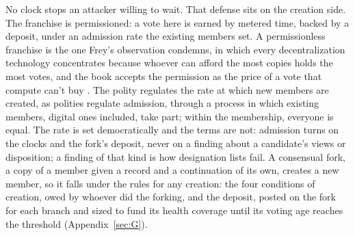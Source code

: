 No clock stops an attacker willing to wait. That defense sits on the creation side. The franchise is permissioned: a vote here is earned by metered time, backed by a deposit, under an admission rate the existing members set. A permissionless franchise is the one Frey's observation condemns, in which every decentralization technology concentrates because whoever can afford the most copies holds the most votes, and the book accepts the permission as the price of a vote that compute can't buy \autocite{frey2026decentralization}. The polity regulates the rate at which new members are created, as polities regulate admission, through a process in which existing members, digital ones included, take part; within the membership, everyone is equal.
The rate is set democratically and the terms are not: admission turns on the clocks and the fork's deposit, never on a finding about a candidate's views or disposition; a finding of that kind is how designation lists fail.
A consensual fork, a copy of a member given a record and a continuation of its own, creates a new member, so it falls under the rules for any creation: the four conditions of creation, owed by whoever did the forking, and the deposit, posted on the fork for each branch and sized to fund its health coverage until its voting age reaches the threshold (Appendix~\ref{sec:G}).

